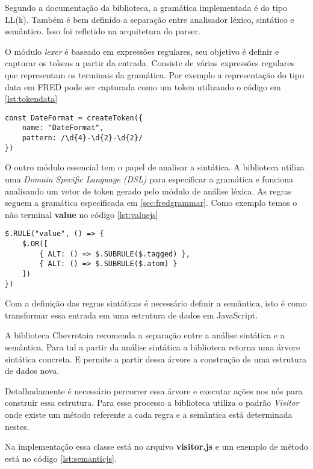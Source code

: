 Segundo a documentação da biblioteca, a gramática implementada é do tipo LL(k). Também é bem definido
a separação entre analisador léxico, sintático e semântico. Isso foi refletido na arquitetura
do parser. 

O módulo \textit{lexer} é baseado em expressões regulares, seu objetivo é definir e 
capturar os tokens a partir da entrada. Consiste de várias expressões regulares
que representam os terminais da gramática. Por exemplo a representação do tipo data em FRED pode
ser capturada como um token utilizando o código em \ref{lst:tokendata}

\begin{lstlisting}[caption=Definição do token para data,label={lst:tokendata}]
const DateFormat = createToken({
    name: "DateFormat",
    pattern: /\d{4}-\d{2}-\d{2}/
})
\end{lstlisting}

O outro módulo essencial tem o papel de analisar a sintática. A biblioteca utiliza uma 
\textit{Domain Specific Language (DSL)} para especificar a gramática e funciona analisando
um vetor de token gerado pelo módulo de análise léxica. As regras seguem a gramática especificada
em \ref{sec:fredgrammar}. Como exemplo temos o não terminal \textbf{value} no código \ref{lst:valuejs}

\begin{lstlisting}[caption=Definição da regra value em JavaScript,label={lst:valuejs}]
$.RULE("value", () => {
    $.OR([
        { ALT: () => $.SUBRULE($.tagged) },
        { ALT: () => $.SUBRULE($.atom) }
    ])
})
\end{lstlisting}

Com a definição das regras sintáticas é necessário definir a semântica, isto é 
como transformar essa entrada em uma estrutura de dados em JavaScript. 

A biblioteca Chevrotain recomenda a separação entre a análise sintática e a semântica. Para tal
a partir da análise sintática a biblioteca retorna uma árvore sintática concreta. E permite a partir 
dessa árvore a construção de uma estrutura de dados nova.

Detalhadamente é necessário percorrer essa árvore e executar ações nos nós para construir essa estrutura.
Para esse processo a biblioteca utiliza o padrão \textit{Visitor} onde existe um método referente
a cada regra e a semântica está determinada nestes.

Na implementação essa classe está no arquivo \textbf{visitor.js} e um exemplo de método 
está no código \ref{lst:semanticjs}.

